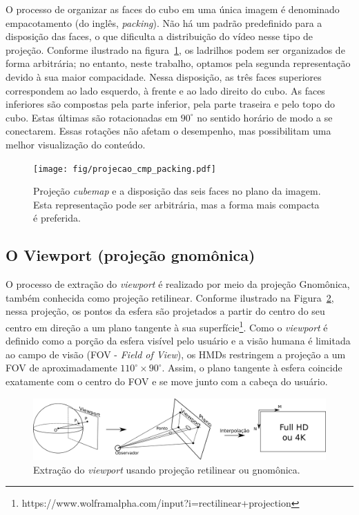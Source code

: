 O processo de organizar as faces do cubo em uma única imagem é denominado empacotamento (do inglês, \textit{packing}). Não há um padrão predefinido para a disposição das faces, o que dificulta a distribuição do vídeo nesse tipo de projeção. Conforme ilustrado na figura~\ref{fig:projecao_cmp_packing}, os ladrilhos podem ser organizados de forma arbitrária; no entanto, neste trabalho, optamos pela segunda representação devido à sua maior compacidade. Nessa disposição, as três faces superiores correspondem ao lado esquerdo, à frente e ao lado direito do cubo. As faces inferiores são compostas pela parte inferior, pela parte traseira e pelo topo do cubo. Estas últimas são rotacionadas em $90^\circ$ no sentido horário de modo a se conectarem. Essas rotações não afetam o desempenho, mas possibilitam uma melhor visualização do conteúdo.

\begin{figure}[h]
	\centering
	\texttt{[image: fig/projecao\_cmp\_packing.pdf]}
	\caption{Projeção \textit{cubemap} e a disposição das seis faces no plano da imagem. Esta representação pode ser arbitrária, mas a forma mais compacta é preferida.}
	\label{fig:projecao_cmp_packing}
\end{figure}

\subsection{O Viewport (projeção gnomônica)}

O processo de extração do \textit{viewport} é realizado por meio da projeção Gnomônica, também conhecida como projeção retilinear. Conforme ilustrado na Figura~\ref{fig:projecao_viewport}, nessa projeção, os pontos da esfera são projetados a partir do centro do seu centro em direção a um plano tangente à sua superfície\footnote{https://www.wolframalpha.com/input?i=rectilinear+projection}. Como o \textit{viewport} é definido como a porção da esfera visível pelo usuário e a visão humana é limitada ao campo de visão (FOV - \textit{Field of View}), os HMDs restringem a projeção a um FOV de aproximadamente $110^\circ \times 90^\circ$. Assim, o plano tangente à esfera coincide exatamente com o centro do FOV e se move junto com a cabeça do usuário.

\begin{figure}[h]
	\centering
	\includegraphics[width=1.0\linewidth]{fig/projecao_viewport.png}
	\caption{Extração do \textit{viewport} usando projeção retilinear ou gnomônica.}
	\label{fig:projecao_viewport}
\end{figure}

